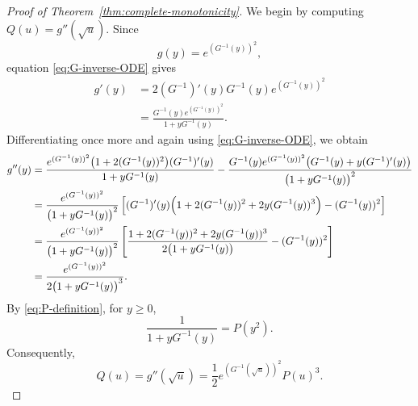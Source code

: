 \documentclass[11pt]{article}
\theoremstyle{definition}
\theoremstyle{remark}
\begin{document}
\begin{proof}[Proof of Theorem~\ref{thm:complete-monotonicity}]
We begin by computing $Q(u)=g''(\sqrt{u})$.  Since
\[
 g(y)=e^{(G^{-1}(y))^2},
\]
equation \eqref{eq:G-inverse-ODE} gives
\[
\begin{aligned}
 g'(y)
 &=2(G^{-1})'(y)G^{-1}(y)e^{(G^{-1}(y))^2} \\
 &=\frac{G^{-1}(y)e^{(G^{-1}(y))^2}}
         {1+yG^{-1}(y)}.
\end{aligned}
\]
Differentiating once more and again using
\eqref{eq:G-inverse-ODE}, we obtain
\begin{align*}
 g''(y)
 &=
 \frac{
 e^{(G^{-1}(y))^2}
 \bigl(1+2(G^{-1}(y))^2\bigr)(G^{-1})'(y)}
 {1+yG^{-1}(y)}-
 \frac{
 G^{-1}(y)e^{(G^{-1}(y))^2}
 \bigl(G^{-1}(y)+y(G^{-1})'(y)\bigr)}
 {\bigl(1+yG^{-1}(y)\bigr)^2}
 \\
 &=
 \frac{e^{(G^{-1}(y))^2}}
      {\bigl(1+yG^{-1}(y)\bigr)^2}
 \left[
 (G^{-1})'(y)
 \Bigl(
  1+2(G^{-1}(y))^2+2y(G^{-1}(y))^3
 \Bigr)
 -(G^{-1}(y))^2
 \right]
 \\
 &=
 \frac{e^{(G^{-1}(y))^2}}
      {\bigl(1+yG^{-1}(y)\bigr)^2}
 \left[
 \frac{
  1+2(G^{-1}(y))^2+2y(G^{-1}(y))^3}
 {2\bigl(1+yG^{-1}(y)\bigr)}
 -(G^{-1}(y))^2
 \right]
 \\
 &=
 \frac{e^{(G^{-1}(y))^2}}
      {2\bigl(1+yG^{-1}(y)\bigr)^3}.
\end{align*}
By \eqref{eq:P-definition}, for $y\geq0$,
\[
 \frac1{1+yG^{-1}(y)}=P(y^2).
\]
Consequently,
\begin{equation}\label{eq:Q-P-formula}
 Q(u)=g''(\sqrt{u})
 =\frac12e^{(G^{-1}(\sqrt{u}))^2}P(u)^3.
\end{equation}


\end{proof}
\end{document}

